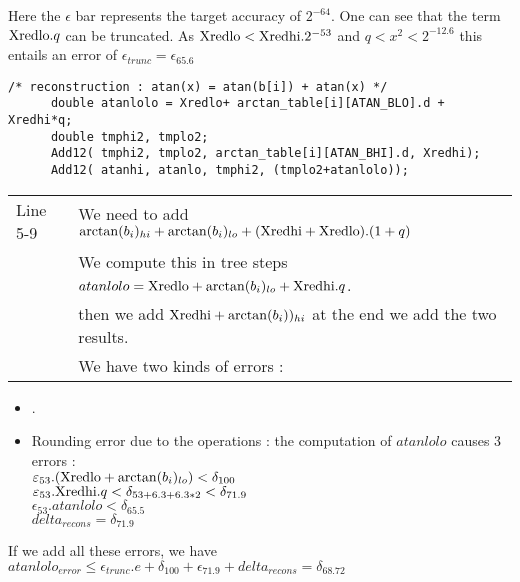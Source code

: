 Here the  $\epsilon$ bar represents the target accuracy of $2^{-64}$.
One can see that the term ${\mathrm{Xredlo}}.q$ can be truncated. As  ${\mathrm{Xredlo}} < {\mathrm{Xredhi}}.2^{-53}$ and $q<x^2<2^{-12.6}$ this entails an error of $\epsilon_{trunc} =
      \epsilon_{65.6}$


\begin{lstlisting}[caption={Reconstruction},firstnumber=1]
      /* reconstruction : atan(x) = atan(b[i]) + atan(x) */
      double atanlolo = Xredlo+ arctan_table[i][ATAN_BLO].d + Xredhi*q;
      double tmphi2, tmplo2;
      Add12( tmphi2, tmplo2, arctan_table[i][ATAN_BHI].d, Xredhi);
      Add12( atanhi, atanlo, tmphi2, (tmplo2+atanlolo));

\end{lstlisting}
\begin{tabular}{ll}
Line 5-9 & We need to add $\arctan(b_i)_{hi}+\arctan(b_i)_{lo} +
      ({\mathrm{Xredhi}}+{\mathrm{Xredlo}}).(1+q)$\\
      &
      We compute this in tree steps $atanlolo= {\mathrm{Xredlo}}+ \arctan(b_i)_{lo}
      + {\mathrm{Xredhi}}.q$.\\
      & then we add ${\mathrm{Xredhi}}+\arctan(b_i))_{hi}$ at the end we add the two results.\\

      &We have two kinds of errors : 
\end{tabular}      
  \begin{itemize} 
    \item .     \item Rounding error due to the operations : the computation of
      $atanlolo$ causes 3 errors :\\
       $ \varepsilon_{53}.({\mathrm{Xredlo}}+ \arctan(b_i)_{lo}) < \delta_{100}$\\
       $\varepsilon_{53}.{\mathrm{Xredhi}}.q < \delta_{53+6.3+6.3*2} < \delta_{71.9}$\\
       $ \epsilon_{53} . atanlolo < \delta_{65.5}$\\
       $delta_{recons} =  \delta_{71.9}$
      \end{itemize}
      If we add all these errors, we have \\
      $atanlolo_{error} \leq \epsilon_{trunc}.e + \delta_{100} +
      \epsilon_{71.9} + delta_{recons} = \delta_{68.72}$\\


